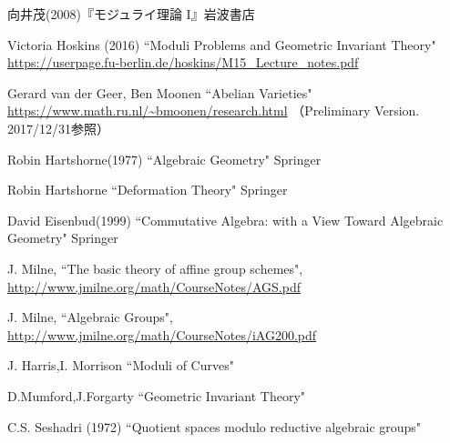 \documentclass[a4paper]{jsarticle}
\begin{document}
\begin{thebibliography}{99}
    向井茂(2008)『モジュライ理論 I』岩波書店
    
    Victoria Hoskins (2016)
    ``Moduli Problems and Geometric Invariant Theory"
    \url{https://userpage.fu-berlin.de/hoskins/M15_Lecture_notes.pdf}

    Gerard van der Geer, Ben Moonen
    ``Abelian Varieties"
    \url{https://www.math.ru.nl/~bmoonen/research.html}
    （Preliminary Version. 2017/12/31参照）

    Robin Hartshorne(1977)
    ``Algebraic Geometry"
    Springer

    Robin Hartshorne
    ``Deformation Theory"
    Springer

    David Eisenbud(1999)
    ``Commutative Algebra: with a View Toward Algebraic Geometry"
    Springer
    
    J. Milne, ``The basic theory of affine group schemes", 
    \url{http://www.jmilne.org/math/CourseNotes/AGS.pdf}
    
    J. Milne, ``Algebraic Groups", 
    \url{http://www.jmilne.org/math/CourseNotes/iAG200.pdf}

    J. Harris,I. Morrison ``Moduli of Curves"

    D.Mumford,J.Forgarty ``Geometric Invariant Theory"

    C.S. Seshadri (1972)
    ``Quotient spaces modulo reductive algebraic groups"

\end{thebibliography}
\end{document}
